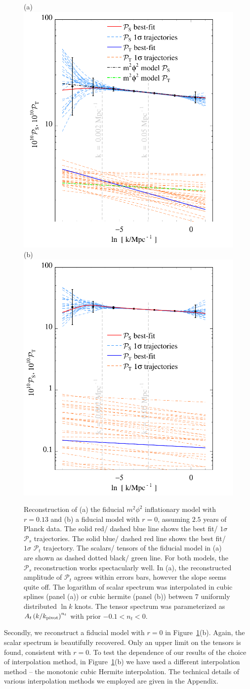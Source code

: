 \documentclass[a4paper,11pt]{article}
\newcommand{\pscalar}{{\mathcal{P}_s}}
\newcommand{\ptensor}{{\mathcal{P}_t}}
\begin{document}
\begin{figure}
  (a)\includegraphics[width=0.45\linewidth]{fc_p7m2phi2_traj11}
  (b)\includegraphics[width=0.45\linewidth]{fc_p7hermite_traj11}
  \caption{Reconstruction of (a) the fiducial $m^2\phi^2$ inflationary
    model with $r=0.13$ and (b) a fiducial model with $r=0$, assuming
    $2.5$ years of Planck data. The solid red/ dashed blue line shows
    the best fit/ $1\sigma$ $\pscalar$ trajectories. The solid blue/
    dashed red line shows the best fit/ $1\sigma$ $\ptensor$
    trajectory. The scalars/ tensors of the fiducial model in (a) are
    shown as dashed dotted black/ green line. For both models, the
    $\pscalar$ reconstruction works spectacularly well. In (a), the
    reconstructed amplitude of $\ptensor$ agrees within errors bars,
    however the slope seems quite off. The logarithm of scalar
    spectrum was interpolated in cubic splines (panel (a)) or cubic
    hermite (panel (b)) between $7$ uniformly distributed $\ln k$
    knots. The tensor spectrum was parameterized as
    $A_t \left(k/k_{\rm pivot}\right)^{n_t}$ with prior
    $-0.1<n_t<0$. } 
  \label{fig:fc_p7m2phi2}
\end{figure}
Secondly, we reconstruct a fiducial model with $r=0$ in
Figure~\ref{fig:fc_p7m2phi2}(b). Again, the scalar spectrum is
beautifully recovered. Only an upper limit on the tensors is found,
consistent with $r=0$. To test the dependence of our results of the
choice of interpolation method, in Figure~\ref{fig:fc_p7m2phi2}(b) we
have used a different interpolation method -- the monotonic cubic
Hermite interpolation.  The technical details of various interpolation
methods we employed are given in the Appendix.
\end{document}
